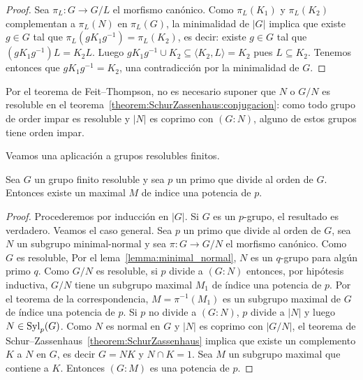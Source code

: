 \begin{proof}
	Sea $\pi_L\colon G\to G/L$ el morfismo canónico. Como
	$\pi_L(K_1)$ y $\pi_L(K_2)$ complementan a $\pi_L(N)$ en $\pi_L(G)$, la minimalidad
	de $|G|$ implica que existe $g\in G$ tal que $\pi_L(gK_1g^{-1})=\pi_L(K_2)$, es
	decir: existe $g\in G$ tal que $(gK_1g^{-1})L=K_2L$.  Luego $gK_1g^{-1}\cup
	K_2\subseteq \langle K_2,L\rangle=K_2$ pues $L\subseteq K_2$. Tenemos entonces que
	$gK_1g^{-1}=K_2$, una contradicción por la minimalidad de $G$. 


%
\end{proof}

\begin{remark}
	Por el teorema de Feit--Thompson, no es necesario suponer que $N$ o $G/N$
	es resoluble en el teorema~\ref{theorem:SchurZassenhaus:conjugacion}: como
	todo grupo de order impar es resoluble y $|N|$ es coprimo con $(G:N)$,
	alguno de estos grupos tiene orden impar.
\end{remark}

Veamos una aplicación a grupos resolubles finitos.

\begin{theorem}
	\label{theorem:solvable_maximal}
	Sea $G$ un grupo finito resoluble y sea $p$ un primo que divide al orden de $G$.
	Entonces existe un maximal $M$ de indice una potencia de $p$.
\end{theorem}

\begin{proof}
	Procederemos por inducción en $|G|$. Si $G$ es un $p$-grupo, el resultado
	es verdadero. Veamos el caso general. Sea $p$ un primo que divide al orden
	de $G$, sea $N$ un subgrupo minimal-normal y sea $\pi\colon G\to G/N$ el
	morfismo canónico. Como $G$ es resoluble, Por el lema~\ref{lemma:minimal_normal}, $N$ es un
	$q$-grupo para algún primo $q$. Como $G/N$ es resoluble, si $p$ divide a
	$(G:N)$ entonces, por hipótesis inductiva, $G/N$ tiene un subgrupo maximal
	$M_1$ de índice una potencia de $p$. Por el teorema de la correspondencia,
	$M=\pi^{-1}(M_1)$ es un subgrupo maximal de $G$ de índice una potencia de
	$p$. Si $p$ no divide a $(G:N)$, $p$ divide a $|N|$ y luego
	$N\in\mathrm{Syl}_p(G)$. Como $N$ es normal en $G$ y $|N|$ es coprimo con $|G/N|$,
	el teorema de Schur--Zassenhaus~\ref{theorem:SchurZassenhaus} implica que
	existe un complemento $K$ a $N$ en $G$, es decir $G=NK$ y $N\cap K=1$. Sea
	$M$ un subgrupo maximal que contiene a $K$. Entonces $(G:M)$ es una
	potencia de $p$.
\end{proof}


